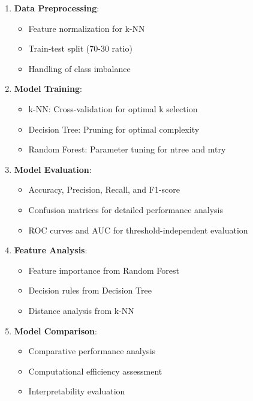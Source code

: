 \begin{enumerate}
    \item \textbf{Data Preprocessing}: 
    \begin{itemize}
        \item Feature normalization for k-NN
        \item Train-test split (70-30 ratio)
        \item Handling of class imbalance
    \end{itemize}
    
    \item \textbf{Model Training}:
    \begin{itemize}
        \item k-NN: Cross-validation for optimal k selection
        \item Decision Tree: Pruning for optimal complexity
        \item Random Forest: Parameter tuning for ntree and mtry
    \end{itemize}
    
    \item \textbf{Model Evaluation}:
    \begin{itemize}
        \item Accuracy, Precision, Recall, and F1-score
        \item Confusion matrices for detailed performance analysis
        \item ROC curves and AUC for threshold-independent evaluation
    \end{itemize}
    
    \item \textbf{Feature Analysis}:
    \begin{itemize}
        \item Feature importance from Random Forest
        \item Decision rules from Decision Tree
        \item Distance analysis from k-NN
    \end{itemize}
    
    \item \textbf{Model Comparison}:
    \begin{itemize}
        \item Comparative performance analysis
        \item Computational efficiency assessment
        \item Interpretability evaluation
    \end{itemize}
\end{enumerate}


